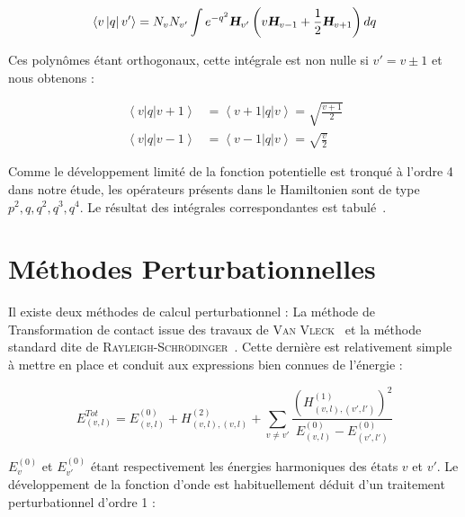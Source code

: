 \begin{equation}
	\left\langle v \left|q \right|v' \right\rangle = N_v N_{v'} \int e^{-q^2} \textsl{\textbf{H}}_{v'}\left(v\textsl{\textbf{H}}_{v-1} + \frac{1}{2} \textsl{\textbf{H}}_{v+1}\right) dq
\end{equation}

Ces polynômes étant orthogonaux, cette intégrale est non nulle si $v' = v\pm 1$ et nous obtenons :

\begin{align}
	\left\langle v \left|q \right| v+1\right\rangle &= \left\langle v+1 \left|q \right| v\right\rangle = \sqrt{\frac{v+1}{2}} \\
	\left\langle v \left|q \right| v-1\right\rangle &= \left\langle v-1 \left|q \right| v\right\rangle = \sqrt{\frac{v}{2}}
\end{align}

Comme le développement limité de la fonction potentielle est tronqué à l'ordre 4 dans notre étude, les opérateurs présents dans le Hamiltonien sont de type $p^2,q,q^2,q^3,q^4$. Le résultat des intégrales correspondantes est tabulé~\cite{II-24}.



\section{Méthodes Perturbationnelles}

Il existe deux méthodes de calcul perturbationnel : La méthode de \og Transformation de contact \fg{} issue des travaux de \textsc{Van Vleck}~\cite{II-21,II-23} et la méthode standard dite de \textsc{Rayleigh-Schrödinger}~\cite{II-22}.
Cette dernière est relativement simple à mettre en place et conduit aux expressions bien connues de l'énergie :

\begin{equation}
	E^{Tot}_{(v,l)} = E^{(0)}_{(v,l)} + H^{(2)}_{(v,l),(v,l)} + \sum_{v\neq v'} \frac{(H^{(1)}_{(v,l),(v',l')})^2}{E^{(0)}_{(v,l)} - E^{(0)}_{(v',l')}}
\end{equation}

$E^{(0)}_v$ et $E^{(0)}_{v'}$ étant respectivement les énergies harmoniques des états $v$ et $v'$.
Le développement de la fonction d'onde est habituellement déduit d'un traitement perturbationnel d'ordre 1 :

